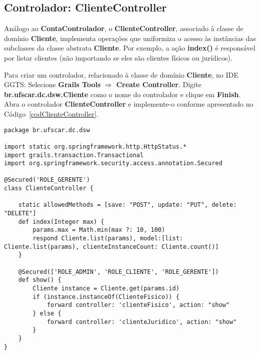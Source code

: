 \newpage

\subsection{Controlador: ClienteController}

\vspace{0.5cm}

Análogo ao {\bf ContaControlador}, o {\bf ClienteController}, associado à classe
de  domínio {\bf  Cliente},  implementa  operações que  uniformiza  o acesso  às
instâncias das subclasses da classe abstrata {\bf Cliente}.  Por exemplo, a ação
{\bf  index()} é responsável  por listar  clientes (não  importando se  eles são
clientes físicos ou jurídicos). 

\vspace{0.3cm}

Para criar um controlador, relacionado à classe de domínio {\bf Cliente}, no IDE
GGTS:   Selecione    {\bf   Grails   Tools}    $\Longrightarrow$   {\bf   Create
  Controller}.  Digite {\bf br.ufscar.dc.dsw.Cliente} como o nome do controlador
e  clique  em  {\bf  Finish}.   Abra o  controlador  {\bf  ClienteController}  e
implemente-o conforme apresentado no Código~\ref{codClienteController}.  


\begin{lstlisting}[caption=Controlador          {\bf         ClienteController},
    frame=trBL,float=htbp, label=codClienteController] 
package br.ufscar.dc.dsw

import static org.springframework.http.HttpStatus.*
import grails.transaction.Transactional
import org.springframework.security.access.annotation.Secured

@Secured('ROLE_GERENTE')
class ClienteController {
    
    static allowedMethods = [save: "POST", update: "PUT", delete: "DELETE"]
    def index(Integer max) {
        params.max = Math.min(max ?: 10, 100)
        respond Cliente.list(params), model:[list: Cliente.list(params), clienteInstanceCount: Cliente.count()]
    }
    
    @Secured(['ROLE_ADMIN', 'ROLE_CLIENTE', 'ROLE_GERENTE'])
    def show() {
        Cliente instance = Cliente.get(params.id)
        if (instance.instanceOf(ClienteFisico)) {
            forward controller: 'clienteFisico', action: "show"
        } else {
            forward controller: 'clienteJuridico', action: "show"
        }
    }
}
\end{lstlisting}

